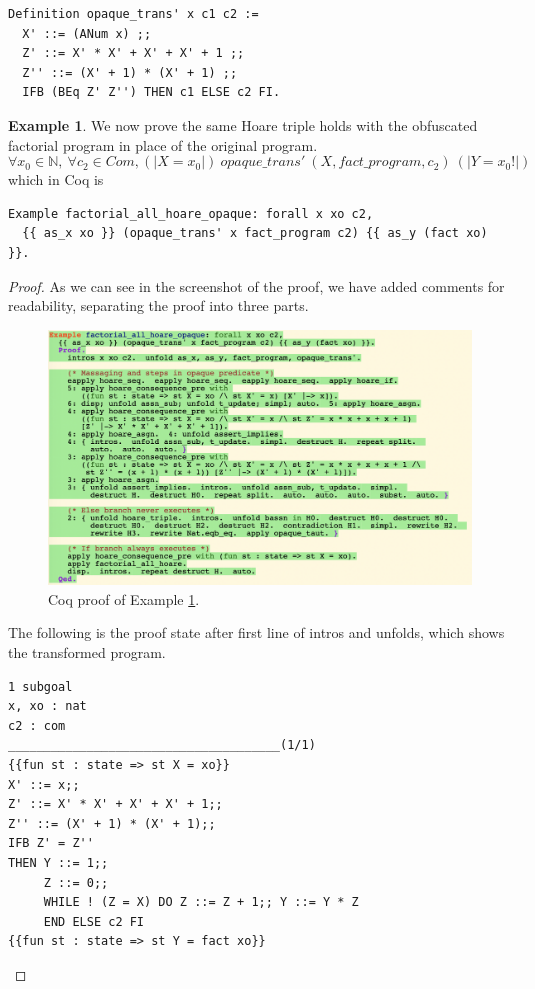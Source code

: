 \documentclass[12pt,notitlepage]{report}
\theoremstyle{plain}
\theoremstyle{definition}
\newtheorem{example}[theo]{Example}
\newcommand\N{\mathbb{N}}
\numberwithin{equation}{section}
\begin{document}
\begin{verbatim}
Definition opaque_trans' x c1 c2 :=
  X' ::= (ANum x) ;;
  Z' ::= X' * X' + X' + X' + 1 ;;
  Z'' ::= (X' + 1) * (X' + 1) ;;
  IFB (BEq Z' Z'') THEN c1 ELSE c2 FI.
\end{verbatim}

\begin{example}\label{hoarel2}
    We now prove the same Hoare triple holds with the obfuscated factorial program in place of the original program.
    \[
     \forall x_0 \in \N,\ \forall c_2 \in Com, (|X=x_0|)\ opaque\_trans'\ (X, fact\_program, c_2)\ (|Y=x_0!|)
    \]
    which in Coq is
    \begin{verbatim}
Example factorial_all_hoare_opaque: forall x xo c2,
  {{ as_x xo }} (opaque_trans' x fact_program c2) {{ as_y (fact xo) }}.\end{verbatim}
\begin{proof}
As we can see in the screenshot of the proof, we have added comments for readability, separating the proof into three parts.

        \begin{figure}[H]
        \centering
        \includegraphics[scale=0.6]{hoare_opaque}
        \caption{Coq proof of Example \ref{hoarel2}.}
        \label{fig:hoare12}
        \end{figure}

The following is the proof state after first line of intros and unfolds, which shows the transformed program.

\begin{verbatim}
1 subgoal
x, xo : nat
c2 : com
______________________________________(1/1)
{{fun st : state => st X = xo}}
X' ::= x;;
Z' ::= X' * X' + X' + X' + 1;;
Z'' ::= (X' + 1) * (X' + 1);;
IFB Z' = Z''
THEN Y ::= 1;;
     Z ::= 0;;
     WHILE ! (Z = X) DO Z ::= Z + 1;; Y ::= Y * Z
     END ELSE c2 FI
{{fun st : state => st Y = fact xo}}\end{verbatim}


\end{proof}
\end{example}
\end{document}
